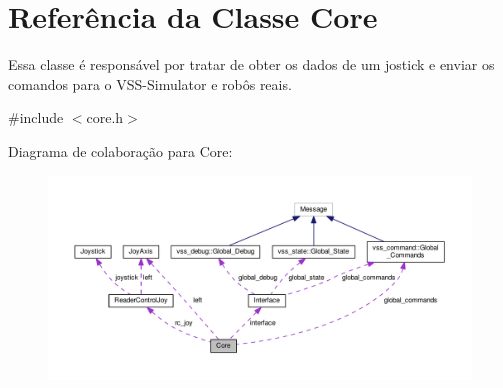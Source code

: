\hypertarget{classCore}{}\section{Referência da Classe Core}
\label{classCore}


Essa classe é responsável por tratar de obter os dados de um jostick e enviar os comandos para o V\+S\+S-\/\+Simulator e robôs reais.  




{\ttfamily \#include $<$core.\+h$>$}



Diagrama de colaboração para Core\+:\nopagebreak
\begin{figure}[H]
\begin{center}
\leavevmode
\includegraphics[width=350pt]{classCore__coll__graph}
\end{center}
\end{figure}
